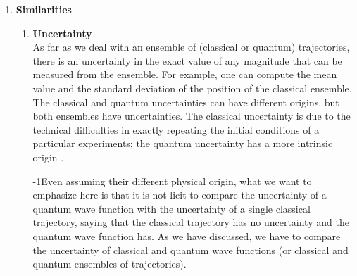 \documentclass[onecolumn,nofootinbib, secnumarabic, amsmath, nobibnotes,11pt,aps,pra]{revtex4-1}
\newcommand{\fref}[1]{Fig. \ref{#1}}
\newcommand{\eref}[1]{Eq. (\ref{#1})}
\begin{document}
\begin{enumerate}
\begin{enumerate}
{\quad}This surprising result for quantum mechanics can  be
illustrated with the double-slit experiment \cite{om.Dewdney}. We  assume that the initial wave functions
for the classical and quantum ensembles are identical at $t_0 = 0$.
Their difference appears in the time evolution of the trajectories.
For the quantum trajectories of the ensemble, the shape of the
ensemble (whether particles are stopped or not by the double-slit
screen) determines the shape of $R(x,t)$, which will affect the
dynamics of all  trajectories, even those trajectories
that are far from the slit (see \fref{om_fig_dobleslit}a). On the
contrary, the classical Hamilton--Jacobi equation,
\eref{om.hamilton_jacobi1D}, is totally independent of $R(x,t)$, so
a single trajectory is completely independent from the rest of
particles (see \fref{om_fig_dobleslit}b).
\end{enumerate}
\item \textbf{Similarities}
\begin{enumerate}
\item \textbf{Uncertainty} \\ As far as we deal with an ensemble of (classical or quantum) trajectories, there is an uncertainty in the exact value of any magnitude that can be measured from the ensemble. For example, one can compute the mean value and the standard deviation of the position of the classical ensemble. The classical and quantum uncertainties can have different origins, but both ensembles have uncertainties. The classical uncertainty is due to the technical difficulties in exactly repeating the initial conditions of a particular experiments; the quantum uncertainty has a more intrinsic origin  \cite{om.extra2,om.extra9}.

{\quad}\looseness-1Even assuming their different physical origin, what we want to
emphasize here is  that it is not licit to compare the uncertainty
of a quantum wave function with the uncertainty of a single
classical trajectory, saying that the classical trajectory has no
uncertainty and the quantum wave function has. As we have discussed,
we have to compare the uncertainty of classical and quantum wave
functions (or classical and quantum ensembles of trajectories).


\end{enumerate}
\end{enumerate}
\end{document}
